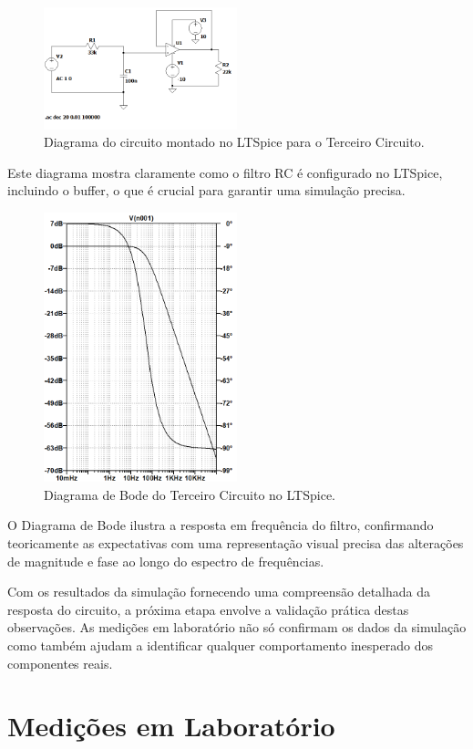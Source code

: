 \documentclass[
	12pt,				%
	openright,			%
	twoside,			%
	a4paper,			%
	english,			%
	french,				%
	spanish,			%
	brazil,				%
	]{abntex2}
\begin{document}
\begin{figure}[H]
    \centering
    \includegraphics[width=0.5\textwidth]{imgs/third_circuit_ltspice_diagram.png}
    \caption{Diagrama do circuito montado no LTSpice para o Terceiro Circuito.}
    \label{fig:third_circuit_ltspice_diagram}
\end{figure}

Este diagrama mostra claramente como o filtro RC é configurado no LTSpice, incluindo o buffer, o que é crucial para garantir uma simulação precisa.

\begin{figure}[H]
    \centering    \includegraphics[width=0.5\textwidth,height=0.4\textwidth]{imgs/third_circuit_ltspice_bode.png}
    \caption{Diagrama de Bode do Terceiro Circuito no LTSpice.}
    \label{fig:third_circuit_ltspice_bode}
\end{figure}

O Diagrama de Bode ilustra a resposta em frequência do filtro, confirmando teoricamente as expectativas com uma representação visual precisa das alterações de magnitude e fase ao longo do espectro de frequências.

Com os resultados da simulação fornecendo uma compreensão detalhada da resposta do circuito, a próxima etapa envolve a validação prática destas observações. As medições em laboratório não só confirmam os dados da simulação como também ajudam a identificar qualquer comportamento inesperado dos componentes reais.

\pagebreak

\chapter{Medições em Laboratório}
\end{document}
